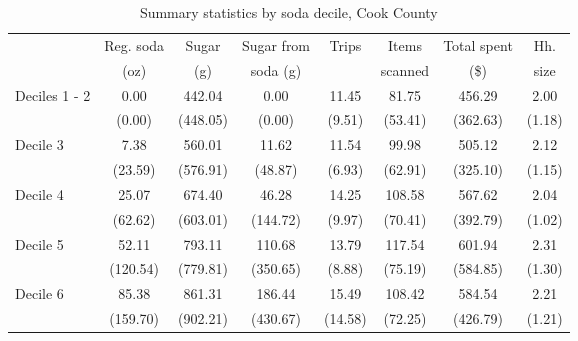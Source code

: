 \begin{spacing}{1.0} 
\begin{table}[h] 
\centering
\caption{Summary statistics by soda decile, Cook County}
\label{summary_deciles} 
\begin{threeparttable}
\begin{tabular}{l*{1}{ccccccc}}
\toprule
                        &Reg. soda &   Sugar &Sugar from&       Trips&Items&Total spent&Hh.\\
            & (oz) & (g) & soda (g) & & scanned& (\$) & size\\
\midrule


\customlinespace Deciles 1 - 2       &        0.00&      442.04&        0.00&       11.45&       81.75&      456.29&        2.00\\
          &        (0.00)&      (448.05)&        (0.00)&        (9.51)&       (53.41)&      (362.63)&        (1.18)\\



\customlinespace Decile 3        &        7.38&      560.01&       11.62&       11.54&       99.98&      505.12&        2.12\\
          &       (23.59)&      (576.91)&       (48.87)&        (6.93)&       (62.91)&      (325.10)&        (1.15)\\



\customlinespace Decile 4        &       25.07&      674.40&       46.28&       14.25&      108.58&      567.62&        2.04\\
          &       (62.62)&      (603.01)&      (144.72)&        (9.97)&       (70.41)&      (392.79)&        (1.02)\\



\customlinespace Decile 5        &       52.11&      793.11&      110.68&       13.79&      117.54&      601.94&        2.31\\
          &      (120.54)&      (779.81)&      (350.65)&        (8.88)&       (75.19)&      (584.85)&        (1.30)\\



\customlinespace Decile 6        &       85.38&      861.31&      186.44&       15.49&      108.42&      584.54&        2.21\\
          &      (159.70)&      (902.21)&      (430.67)&       (14.58)&       (72.25)&      (426.79)&        (1.21)\\




\end{tabular}
\end{threeparttable}
\end{table}
\end{spacing}
